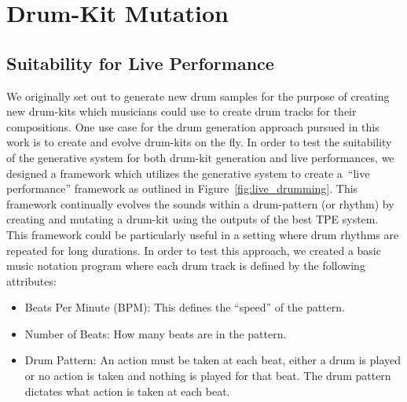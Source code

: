 \documentclass[\main/thesis.tex]{subfiles}
\begin{document}
\chapter{Drum-Kit Mutation}
\section{Suitability for Live Performance}

We originally set out to generate new drum samples for the purpose of creating new drum-kits which musicians could use to create drum tracks for their compositions. One use case for the drum generation approach pursued in this work is to create and evolve drum-kits on the fly.  In order to test the suitability of the generative system for both drum-kit generation and live performances, we designed a framework which utilizes the generative system to create a~\enquote{live performance} framework as outlined in Figure~\ref{fig:live_drumming}. This framework continually evolves the sounds within a drum-pattern (or rhythm) by creating and mutating a drum-kit using the outputs of the best TPE system. This framework could be particularly useful in a setting where drum rhythms are repeated for long durations. In order to test this approach, we created a basic music notation program where each drum track is defined by the following attributes:

\begin{itemize}
    \item Beats Per Minute (BPM): This defines the \enquote{speed} of the pattern. 
    \item Number of Beats: How many beats are in the pattern.
    \item Drum Pattern: An action must be taken at each beat, either a drum is played or no action is taken and nothing is played for that beat. The drum pattern dictates what action is taken at each beat.
\end{itemize}
\end{document}
